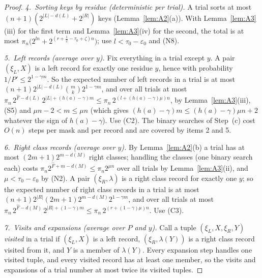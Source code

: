 \documentclass[11pt]{article}
\theoremstyle{definition}
\newcommand{\eps}{\varepsilon}
\newcommand{\abs}[1]{\lvert #1\rvert}
\begin{document}
\begin{proof}
\emph{4.\ Sorting keys by residue (deterministic per trial).} A trial sorts at most
$(n+1)(2^{\abs L-d(L)}+2^{\abs R})$ keys (Lemma~\ref{lem:A2}(a)). With Lemma~\ref{lem:A3}(iii) for the first term and
Lemma~\ref{lem:A3}(iv) for the second, the total is at most
$\pi_n\bigl(2^{ln}+2^{(r+\frac12-\tau_0+\zeta)n}\bigr)$; use $l<\tau_0-\eps_0$ and \textup{(N8)}.

\emph{5.\ Left records (average over $y$).} Fix everything in a trial except $y$. A pair $(\xi_L,X)$ is a left
record for exactly one residue $y$, hence with probability $1/P'\le2^{1-\gamma m}$. So the expected number of left
records in a trial is at most $(n+1)2^{\abs L-d(L)}\binom mk2^{1-\gamma m}$, and over all trials at most
$\pi_n\,2^{\hat F-d(L)}\,2^{\abs L+(h(a)-\gamma)m}\le\pi_n\,2^{(l+(h(a)-\gamma)\mu)n}$, by Lemma~\ref{lem:A3}(iii),
\textup{(S5)} and $\mu n-2<m\le\mu n$ (which gives $(h(a)-\gamma)m\le(h(a)-\gamma)\mu n+2$ whatever the sign of
$h(a)-\gamma$). Use \textup{(C2)}.
The binary searches of Step~(c) cost $O(n)$ steps per mask and per record and are covered by items 2 and 5.

\emph{6.\ Right class records (average over $y$).} By Lemma~\ref{lem:A2}(b) a trial has at most
$(2m+1)2^{m-d(M)}$ right classes; handling the classes (one binary search each) costs
$\pi_n2^{\hat F+m-d(M)}\le\pi_n2^{\mu n}$ over all trials by Lemma~\ref{lem:A3}(ii), and $\mu<\tau_0-\eps_0$ by
\textup{(N2)}. A pair $(\xi_R,\lambda)$ is a right class record for exactly one $y$; so the expected number of right
class records in a trial is at most $(n+1)2^{\abs R}(2m+1)2^{m-d(M)}2^{1-\gamma m}$, and over all trials at most
$\pi_n\,2^{\hat F-d(M)}\,2^{\abs R+(1-\gamma)m}\le\pi_n\,2^{(r+(1-\gamma)\mu)n}$. Use \textup{(C3)}.

\emph{7.\ Visits and expansions (average over $P$ and $y$).} Call a tuple $(\xi_L,X,\xi_R,Y)$ \emph{visited} in a
trial if $(\xi_L,X)$ is a left record, $(\xi_R,\lambda(Y))$ is a right class record visited from it, and $Y$ is a
member of $\lambda(Y)$. Every expansion step handles one visited tuple, and every visited record has at least one
member, so the visits and expansions of a trial number at most twice its visited tuples.


\end{proof}
\end{document}
